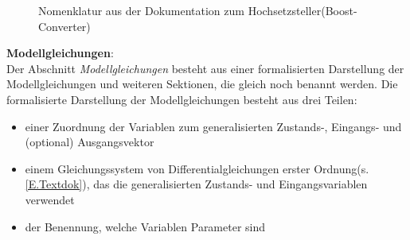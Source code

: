 \begin{figure}[H]
	\centering
	\caption{Nomenklatur aus der Dokumentation zum Hochsetzsteller(Boost-Converter)}
	\label{fig:BspDok_Nomenclature}
\end{figure}
%
\textbf{Modellgleichungen}:\\
Der Abschnitt \textit{Modellgleichungen} besteht aus einer formalisierten Darstellung der Modellgleichungen und weiteren Sektionen, die gleich noch benannt werden. Die formalisierte Darstellung der Modellgleichungen besteht aus drei Teilen:  
\begin{itemize}[label=$\bullet$]
	\item einer Zuordnung der Variablen zum generalisierten Zustands-, Eingangs- und (optional) Ausgangsvektor
	\item einem Gleichungssystem von Differentialgleichungen erster Ordnung(s. \ref{E.Textdok}), das die generalisierten Zustands- und Eingangsvariablen verwendet
	\item der Benennung, welche Variablen Parameter sind
\end{itemize} 

